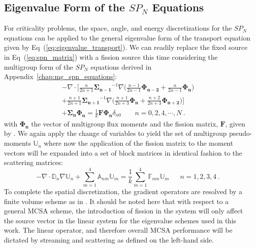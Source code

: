 \subsection{Eigenvalue Form of the $SP_N$ Equations}
\label{subsec:eigenvalue_form}
For criticality problems, the space, angle, and energy discretizations
for the $SP_N$ equations can be applied to the general eigenvalue form
of the transport equation given by
Eq~(\ref{eq:eigenvalue_transport}). We can readily replace the fixed
source in Eq~(\ref{eq:spn_matrix}) with a fission source this time
considering the multigroup form of the $SP_N$ equations derived in
Appendix~\ref{chap:mg_spn_equations}:
\begin{multline}
  -\nabla \cdot \Bigg[\frac{n}{2n+1}\mathbf{\Sigma_{n-1}}^{-1} \nabla
    \Big(\frac{n-1}{2n-1} \mathbf{\Phi_{n-2}} +
    \frac{n}{2n-1}\mathbf{\Phi_n} \Big) \\+
    \frac{n+1}{2n+1}\mathbf{\Sigma_{n+1}}^{-1} \nabla
    \Big(\frac{n+1}{2n+3}\mathbf{\Phi_n} +
    \frac{n+2}{2n+3}\mathbf{\Phi_{n+2}}\Big) \Bigg] \\+
  \mathbf{\Sigma_n} \mathbf{\Phi_n} = \frac{1}{k} \mathbf{F}
  \mathbf{\Phi_n} \delta_{n0} \ \ \ \ \ \ \ \ \ n = 0,2,4,\cdots,N\:.
  \label{eq:multigroup_spn_eigenvalue}
\end{multline}
with $\mathbf{\Phi_n}$ the vector of multigroup flux moments and the
fission matrix, $\mathbf{F}$, given by
\cite{evans_simplified_2013}. We again apply the change of variables
to yield the set of multigroup pseudo-moments $\mathbb{U}_n$ where now
the application of the fission matrix to the moment vectors will be
expanded into a set of block matrices in identical fashion to the
scattering matrices:
\begin{equation}
  -\nabla \cdot \mathbb{D}_n \nabla \mathbb{U}_n + \sum_{m=1}^4
  \mathbb{A}_{nm} \mathbb{U}_m = \frac{1}{k} \sum_{m=1}^4
  \mathbb{F}_{nm} \mathbb{U}_m\ \ \ \ \ \ \ n = 1,2,3,4\:.
  \label{eq:spn_fission_matrix}
\end{equation}
To complete the spatial discretization, the gradient operators are
resolved by a finite volume scheme as in
\cite{evans_simplified_2013}. It should be noted here that with
respect to a general MCSA scheme, the introduction of fission in the
system will only affect the source vector in the linear system for the
eigenvalue schemes used in this work. The linear operator, and
therefore overall MCSA performance will be dictated by streaming and
scattering as defined on the left-hand side.

